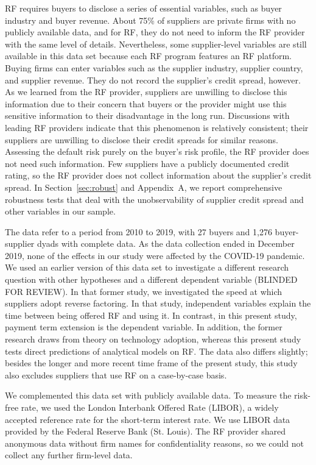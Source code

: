 \documentclass[A4,11pt]{article}
\renewcommand{\~}[1]{\tilde{#1}}
\renewcommand{\-}[1]{\overline{#1}}
\begin{document}
RF requires buyers to disclose a series of essential variables, such as buyer industry and buyer revenue. About 75\% of suppliers are private firms with no publicly available data, and for RF, they do not need to inform the RF provider with the same level of details. Nevertheless, some supplier-level variables are still available in this data set because each RF program features an RF platform. Buying firms can enter variables such as the supplier industry, supplier country, and supplier revenue. They do not record the supplier's credit spread, however. As we learned from the RF provider, suppliers are unwilling to disclose this information due to their concern that buyers or the provider might use this sensitive information to their disadvantage in the long run. Discussions with leading RF providers indicate that this phenomenon is relatively consistent; their suppliers are unwilling to disclose their credit spreads for similar reasons. Assessing the default risk purely on the buyer's risk profile, the RF provider does not need such information. Few suppliers have a publicly documented credit rating, so the RF provider does not collect information about the supplier's credit spread. In Section~\ref{sec:robust} and Appendix~A, we report comprehensive robustness tests that deal with the unobservability of supplier credit spread and other variables in our sample.

The data refer to a period from 2010 to 2019, with 27 buyers and 1,276 buyer-supplier dyads with complete data. As the data collection ended in December 2019, none of the effects in our study were affected by the COVID-19 pandemic. We used an earlier version of this data set to investigate a different research question with other hypotheses and a different dependent variable (BLINDED FOR REVIEW). In that former study, we investigated the speed at which suppliers adopt reverse factoring. In that study, independent variables explain the time between being offered RF and using it. In contrast, in this present study, payment term extension is the dependent variable. In addition, the former research draws from theory on technology adoption, whereas this present study tests direct predictions of analytical models on RF. The data also differs slightly; besides the longer and more recent time frame of the present study, this study also excludes suppliers that use RF on a case-by-case basis.

We complemented this data set with publicly available data. To measure the risk-free rate, we used the London Interbank Offered Rate (LIBOR), a widely accepted reference rate for the short-term interest rate. We use LIBOR data provided by the Federal Reserve Bank (St. Louis). The RF provider shared anonymous data without firm names for confidentiality reasons, so we could not collect any further firm-level data.
\end{document}

